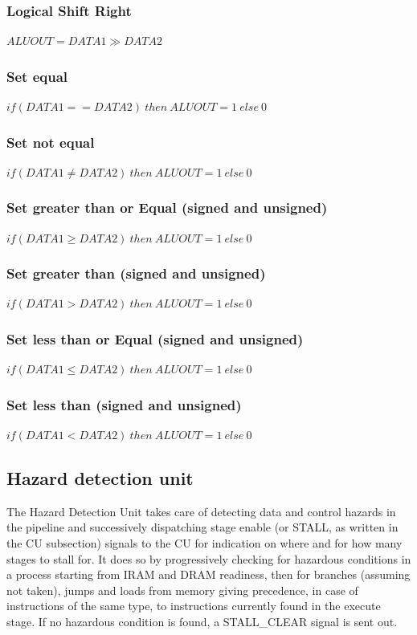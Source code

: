 \subsubsection{Logical Shift Right}
$ \mathit{ALUOUT} = \mathit{DATA1} \gg \mathit{DATA2} $

\subsubsection{Set equal}
$ \mathit{if (DATA1 == DATA2) \: then} \: \mathit{ALUOUT} = 1 \: \mathit{else} \: 0 $

\subsubsection{Set not equal}
$ \mathit{if (DATA1 \neq DATA2) \: then} \: \mathit{ALUOUT} = 1 \: \mathit{else} \: 0 $

\subsubsection{Set greater than or Equal (signed and unsigned)}
$ \mathit{if (DATA1 \geq DATA2) \: then} \: \mathit{ALUOUT} = 1 \: \mathit{else} \: 0 $

\subsubsection{Set greater than (signed and unsigned)}
$ \mathit{if (DATA1 > DATA2) \: then} \: \mathit{ALUOUT} = 1 \: \mathit{else} \: 0 $

\subsubsection{Set less than or Equal (signed and unsigned)}
$ \mathit{if (DATA1 \leq DATA2) \: then} \: \mathit{ALUOUT} = 1 \: \mathit{else} \: 0 $

\subsubsection{Set less than (signed and unsigned)}
$ \mathit{if (DATA1 < DATA2) \: then} \: \mathit{ALUOUT} = 1 \: \mathit{else} \: 0 $

\subsection{Hazard detection unit}
The Hazard Detection Unit takes care of detecting data and control hazards in the pipeline and successively dispatching stage enable (or STALL, as written in the CU subsection) signals to the CU for indication on where and for how many stages to stall for. It does so by progressively checking for hazardous conditions in a process starting from IRAM and DRAM readiness, then for branches (assuming not taken), jumps and loads from memory giving precedence, in case of instructions of the same type, to instructions currently found in the execute stage. If no hazardous condition is found, a STALL\_CLEAR signal is sent out.

